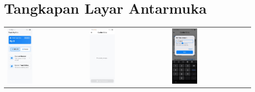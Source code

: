 \chapter{Tangkapan Layar Antarmuka}
\label{chapter:tangkapan-layar-antarmuka}

\begin{tabular}{lll}
    \includegraphics[width=0.33\textwidth]{images/UI/choose-document-2.jpg} &
    \includegraphics[width=0.33\textwidth]{images/UI/extracting.jpg} &
    \includegraphics[width=0.33\textwidth]{images/UI/struk-edit-ta.jpg}

\end{tabular}
